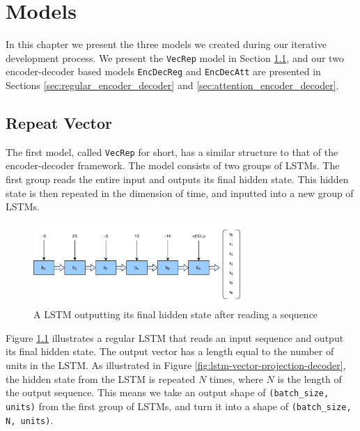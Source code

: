 
\chapter{Models}
\label{ch:models}
In this chapter we present the three models we created during our iterative development process. We present the {\tt VecRep} model in Section \ref{sec:repeat_vector}, and our two encoder-decoder based models {\tt EncDecReg} and {\tt EncDecAtt} are presented in Sections \ref{sec:regular_encoder_decoder} and \ref{sec:attention_encoder_decoder}.


\section{Repeat Vector}
\label{sec:repeat_vector}
The first model, called {\tt VecRep} for short, has a similar structure to that of the encoder-decoder framework. The model consists of two groups of LSTMs. The first group reads the entire input and outputs its final hidden state. This hidden state is then repeated in the dimension of time, and inputted into a new group of LSTMs.

\begin{figure}[ht]
    \centering
    \includegraphics[width=0.7\textwidth]{fig/development_process/lstm-vector-projection-encoder.png}
    \caption{A LSTM outputting its final hidden state after reading a sequence}
    \label{fig:lstm-vector-projection-encoder}
\end{figure}

Figure \ref{fig:lstm-vector-projection-encoder} illustrates a regular LSTM that reads an input sequence and output its final hidden state. The output vector has a length equal to the number of units in the LSTM. As illustrated in Figure \ref{fig:lstm-vector-projection-decoder}, the hidden state from the LSTM is repeated \(N\) times, where \(N\) is the length of the output sequence. This means we take an output shape of {\tt (batch\_size, units)} from the first group of LSTMs, and turn it into a shape of {\tt (batch\_size, N, units)}.

